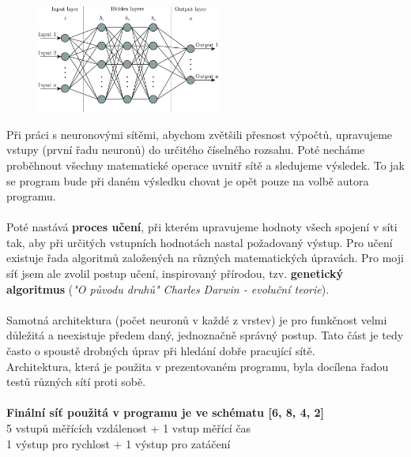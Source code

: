 \documentclass[a4paper,12pt]{article}
\newcommand{\tab}
{
    \hspace*{1em}
}
\begin{document}
        \vspace{-0.3em}
        \begin{figure}[H]
            \centering
            \includegraphics[width=0.54\textwidth]{data/nn-scheme.png}
            \label{fig:deepnn}
        \end{figure}

        Při práci s neuronovými sítěmi, abychom zvětšili přesnost výpočtů, upravujeme vstupy
        (první řadu neuronů) do určitého číselného rozsahu. Poté necháme proběhnout všechny 
        matematické operace uvnitř sítě a sledujeme výsledek. To jak se program bude při daném 
        výsledku chovat je opět pouze na volbě autora programu.\\\\
        \tab Poté nastává \textbf{proces učení}, při kterém upravujeme hodnoty všech spojení v síti tak,
        aby při určitých vstupních hodnotách nastal požadovaný výstup. Pro učení existuje řada algoritmů
        založených na různých matematických úpravách. Pro moji síť jsem ale zvolil postup učení,
        inspirovaný přírodou, tzv. \textbf{genetický algoritmus} (\textit{"O původu druhů" Charles Darwin - evoluční teorie}).\\\\
        \tab Samotná architektura (počet neuronů v každé z vrstev) je pro funkčnost velmi
        důležitá a neexistuje předem daný, jednoznačně správný postup. Tato část je tedy často o 
        spoustě drobných úprav při hledání dobře pracující sítě.\\
        \tab Architektura, která je použita v prezentovaném programu, byla docílena řadou testů
        různých sítí proti sobě.\\\\
        \textbf{Finální síť použitá v programu je ve schématu [6, 8, 4, 2]}\\
        5 vstupů měřících vzdálenost + 1 vstup měřící čas\\
        1 výstup pro rychlost + 1 výstup pro zatáčení
\end{document}
